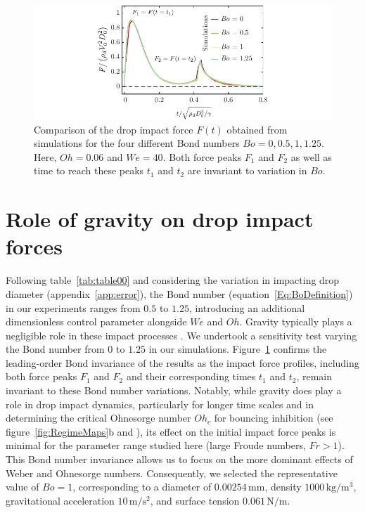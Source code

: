 \documentclass{jfm}
\begin{document}
	
	\begin{figure}
		\centering
		\includegraphics[width=\textwidth]{Figures/figureA1.pdf}
		\caption{Comparison of the drop impact force $F(t)$ obtained from simulations for the four different Bond numbers $Bo = 0, 0.5, 1, 1.25$. Here, $Oh = 0.06$ and $We = 40$. Both force peaks $F_1$ and $F_2$ as well as time to reach these peaks $t_1$ and $t_2$ are invariant to variation in $Bo$.}
		\label{fig:AppGravity}
	\end{figure}
	
	\section{Role of gravity on drop impact forces}
	\label{app:gravity}
	
	Following table~\ref{tab:table00} and considering the variation in impacting drop diameter (appendix~\ref{app:error}), the Bond number (equation~\eqref{Eq:BoDefinition}) in our experiments ranges from $0.5$ to $1.25$, introducing an additional dimensionless control parameter alongside $We$ and $Oh$. 
	Gravity typically plays a negligible role in these impact processes \citep{sanjay_chantelot_lohse_2023,sanjay2024PRL}. We undertook a sensitivity test varying the Bond number from $0$ to $1.25$ in our simulations. 
	Figure~\ref{fig:AppGravity} confirms the leading-order Bond invariance of the results as the impact force profiles, including both force peaks $F_1$ and $F_2$ and their corresponding times $t_1$ and $t_2$, remain invariant to these Bond number variations.
	Notably, while gravity does play a role in drop impact dynamics, particularly for longer time scales and in determining the critical Ohnesorge number $Oh_c$ for bouncing inhibition (see figure~\ref{fig:RegimeMaps}b and \citet{sanjay_chantelot_lohse_2023}), its effect on the initial impact force peaks is minimal for the parameter range studied here (large Froude numbers, $Fr > 1$). This Bond number invariance allows us to focus on the more dominant effects of Weber and Ohnesorge numbers.
	Consequently, we selected the representative value of $Bo = 1$, corresponding to a diameter of $0.00254\,\si{\milli\meter}$, density $1000\,\si{\kilogram/\meter^3}$, gravitational acceleration $10\,\si{\meter/\second^2}$, and surface tension $0.061\,\si{\newton/\meter}$.
	
	
	
	
	
\end{document}
